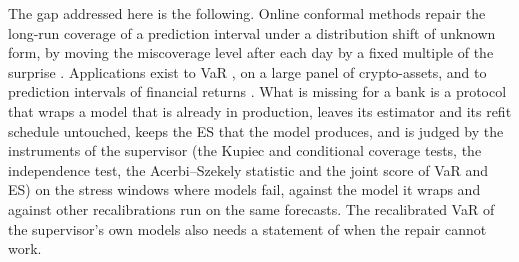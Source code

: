 The gap addressed here is the following. Online conformal methods repair the long-run coverage of a prediction interval under a distribution shift of unknown form, by moving the miscoverage level after each day by a fixed multiple of the surprise \citep{gibbs2021,gibbs2024,zaffran2022,angelopoulos2023}. Applications exist to VaR \citep{fantazzini2024}, on a large panel of crypto-assets, and to prediction intervals of financial returns \citep{aich2025}. What is missing for a bank is a protocol that wraps a model that is already in production, leaves its estimator and its refit schedule untouched, keeps the ES that the model produces, and is judged by the instruments of the supervisor (the Kupiec and conditional coverage tests, the independence test, the Acerbi--Szekely statistic and the joint score of VaR and ES) on the stress windows where models fail, against the model it wraps and against other recalibrations run on the same forecasts. The recalibrated VaR of the supervisor's own models also needs a statement of when the repair cannot work.

